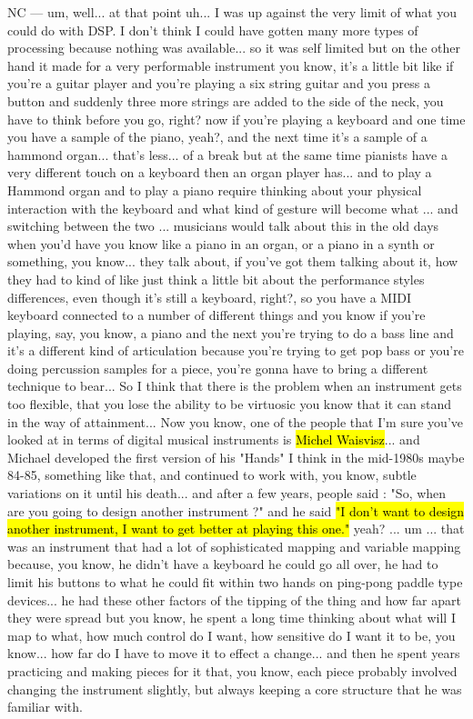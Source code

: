 NC — um, well... at that point uh... I was up against the very limit of what you could do with DSP. I don't think I could have gotten many more types of processing because nothing was available... so it was self limited but on the other hand it made for a very performable instrument you know, it's a little bit like if you're a guitar player and you're playing a six string guitar and you press a button and suddenly three more strings are added to the side of the neck, you have to think before you go, right? now if you're playing a keyboard and one time you have a sample of the piano, yeah?, and the next time it's a sample of a hammond organ... that's less... of a break but at the same time pianists have a very different touch on a keyboard then an organ player has... and to play a Hammond organ and to play a piano require thinking about your physical interaction with the keyboard and what kind of gesture will become what ...  and switching between the two ... musicians would talk about this in the old days when you'd have you know like a piano in an organ, or a piano in a synth or something, you know... they talk about, if you've got them talking about it, how they had to kind of like just think a little bit about the performance styles differences, even though it's still a keyboard, right?, so you have a MIDI keyboard connected to a number of different things and you know if you're playing, say, you know, a piano and the next you're trying to do a bass line and it's a different kind of articulation because you're trying to get pop bass or you're doing percussion samples for a piece, you're gonna have to bring a different technique to bear... So I think that there is the problem when an instrument gets too flexible, that you lose the ability to be virtuosic you know that it can stand in the way of attainment... Now you know, one of the people that I'm sure you've looked at in terms of digital musical instruments is \hl{Michel Waisvisz}... and Michael developed the first version of his "Hands" I think in the mid-1980s maybe 84-85, something like that, and continued to work with, you know, subtle variations on it until his death... and after a few years, people said : "So, when are you going to design another instrument ?" and he said \hl{"I don't want to design another instrument,  I want to get better at playing this one."} yeah? ... um ... that was  an instrument that had a lot of sophisticated mapping and variable mapping because, you know, he didn't have a keyboard he could go all over, he had to limit his buttons to what he could fit within two hands on ping-pong paddle type devices... he had these other factors of the tipping of the thing and how far apart they were spread but you know, he spent a long time thinking about what will I map to what, how much control do I want, how sensitive do I want it to be, you know... how far do I have to move it to effect a change... and then he spent years practicing and making pieces for it that, you know, each piece probably involved changing the instrument slightly, but always keeping a core structure that he was familiar with. 


